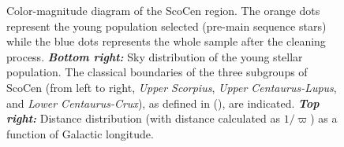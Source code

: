 \begin{figure}[!ht]
\centering
\caption{\scriptsize{Color-magnitude diagram of the ScoCen region. The orange dots represent the young population selected (pre-main sequence stars) while the blue dots represents the whole sample after the cleaning process. \textit{\textbf{Bottom right:}} Sky distribution of the young stellar population. The classical boundaries of the three subgroups of ScoCen (from left to right, \textit{Upper Scorpius}, \textit{Upper Centaurus-Lupus}, and \textit{Lower Centaurus-Crux}), as defined in  (\citeyear{1999AJ....117..354D}), are indicated. \textit{\textbf{Top right:}} Distance distribution (with distance calculated as $1/\varpi$) as a function of Galactic longitude.}}
\label{fig:ScoOB_premain}
\end{figure}


